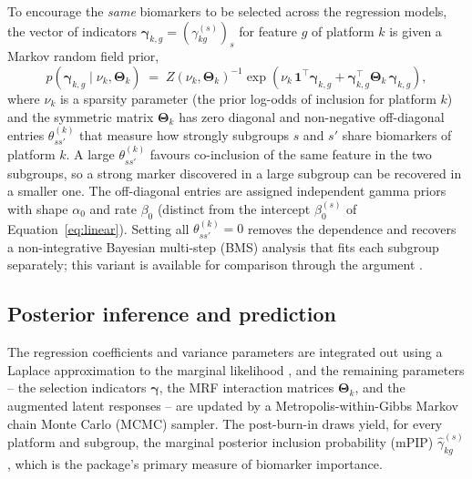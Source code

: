 \documentclass[article]{jss}
\begin{document}
To encourage the \emph{same} biomarkers to be selected across the regression
models, the vector of indicators
$\bm{\gamma}_{k,g}=(\gamma^{(s)}_{kg})_{s}$ for feature $g$ of platform $k$ is
given a Markov random field prior,
%
\begin{equation}\label{eq:mrf}
  p\!\left(\bm{\gamma}_{k,g}\mid\nu_k,\bm{\Theta}_k\right)
  \;=\; Z(\nu_k,\bm{\Theta}_k)^{-1}
  \exp\!\left(\nu_k\,\bm{1}^{\top}\bm{\gamma}_{k,g}
  + \bm{\gamma}_{k,g}^{\top}\bm{\Theta}_k\,\bm{\gamma}_{k,g}\right),
\end{equation}
%
where $\nu_k$ is a sparsity parameter (the prior log-odds of inclusion for
platform $k$) and the symmetric matrix $\bm{\Theta}_k$ has zero diagonal and
non-negative off-diagonal entries $\theta^{(k)}_{ss'}$ that measure how strongly
subgroups $s$ and $s'$ share biomarkers of platform $k$. A large
$\theta^{(k)}_{ss'}$ favours co-inclusion of the same feature in
the two subgroups, so a strong marker discovered in a large subgroup can be
recovered in a smaller one. The off-diagonal entries are assigned independent
gamma priors with shape $\alpha_0$ and rate $\beta_0$ (distinct from the
intercept $\beta_0^{(s)}$ of Equation~\ref{eq:linear}). Setting all
$\theta^{(k)}_{ss'}=0$ removes the dependence and recovers a non-integrative
Bayesian multi-step (BMS) analysis that fits each subgroup
separately; this variant is available for comparison through the argument
.

\subsection{Posterior inference and prediction}\label{sec:inference}

The regression coefficients and variance parameters are integrated out using a
Laplace approximation to the marginal likelihood \citep{johnson2012}, and the
remaining parameters -- the selection indicators $\bm{\gamma}$, the MRF
interaction matrices $\bm{\Theta}_k$, and the augmented latent responses -- are
updated by a Metropolis-within-Gibbs Markov chain Monte Carlo (MCMC) sampler.
The post-burn-in draws yield, for every platform and subgroup, the marginal
posterior inclusion probability (mPIP) $\hat\gamma^{(s)}_{kg}$, which is the
package's primary measure of biomarker importance.
\end{document}
